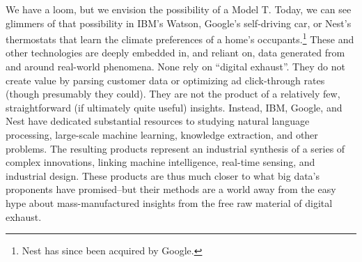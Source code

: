 \documentclass[12pt]{article}
\begin{document}
We have a loom, but we envision the possibility of a Model T. Today,
we can see glimmers of that possibility in IBM's Watson, Google's
self-driving car, or Nest's thermostats that learn the climate
preferences of a home's occupants.\footnote{Nest has since been
  acquired by Google.} These and other technologies are
deeply embedded in, and reliant on, data generated from and around
real-world phenomena. None rely on ``digital exhaust''. They do not
create value by parsing customer data or optimizing ad click-through
rates (though presumably they could). They are not the product of a
relatively few, straightforward (if ultimately quite useful)
insights. Instead, IBM, Google, and Nest have dedicated substantial
resources to studying natural language processing, large-scale machine
learning, knowledge extraction, and other problems. The resulting
products represent an industrial synthesis of a series of complex
innovations, linking machine intelligence, real-time sensing, and
industrial design. These products are thus much closer to what big
data's proponents have promised--but their methods are a world away
from the easy hype about mass-manufactured insights from the free raw
material of digital exhaust.





\end{document}
